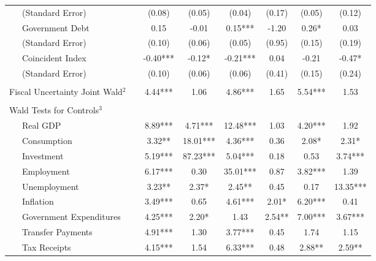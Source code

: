 \begin{table}
{\begin{center}
\begin{tabular}{l|S[table-format=3.2] S[table-format=3.2] S[table-format=3.2] S[table-format=3.2] S[table-format=3.2] S[table-format=3.2]}
~~~(Standard Error) & (0.08) & (0.05) & (0.04) & (0.17) & (0.05) & (0.12) \\ [0.2pc]
~~~Government Debt & 0.15 & -0.01 & 0.15*** & -1.20 & 0.26* & 0.03 \\
~~~(Standard Error) & (0.10) & (0.06) & (0.05) & (0.95) & (0.15) & (0.19) \\ [0.2pc]
~~~Coincident Index & -0.40*** & -0.12* & -0.21*** & 0.04 & -0.21 & -0.47* \\
~~~(Standard Error) & (0.10) & (0.06) & (0.06) & (0.41) & (0.15) & (0.24) \\ [0.2pc]
\hline
 &  \\ [-0.25pc]
Fiscal Uncertainty Joint Wald$^2$~~ & 4.44*** & 1.06 & 4.86*** & 1.65 & 5.54*** & 1.53 \\ [0.5pc] \hline
 &  \\ [-0.25pc]
Wald Tests for Controls$^3$ &  \\ [0.5pc]
~~~Real GDP & 8.89*** & 4.71*** & 12.48*** & 1.03 & 4.20*** & 1.92 \\
~~~Consumption & 3.32** & 18.01*** & 4.36*** & 0.36 & 2.08* & 2.31* \\
~~~Investment & 5.19*** & 87.23*** & 5.04*** & 0.18 & 0.53 & 3.74*** \\
~~~Employment & 6.17*** & 0.30 & 35.01*** & 0.87 & 3.82*** & 1.39 \\
~~~Unemployment & 3.23** & 2.37* & 2.45** & 0.45 & 0.17 & 13.35*** \\
~~~Inflation & 3.49*** & 0.65 & 4.61*** & 2.01* & 6.20*** & 0.41 \\
~~~Government Expenditures & 4.25*** & 2.20* & 1.43 & 2.54** & 7.00*** & 3.67*** \\
~~~Transfer Payments & 4.91*** & 1.30 & 3.77*** & 0.45 & 1.74 & 1.15 \\
~~~Tax Receipts & 4.15*** & 1.54 & 6.33*** & 0.48 & 2.88** & 2.59** \\



\end{tabular}
\end{center}}
\end{table}
